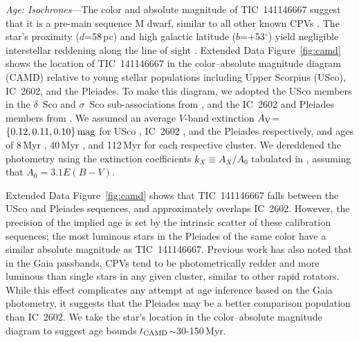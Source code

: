 \documentclass{nature3}
\begin{document}
\begin{methods}
{\it Age: Isochrones}---The color and absolute magnitude of
TIC~141146667 suggest that it is a pre-main sequence M dwarf, similar to
all other known CPVs \cite{Stauffer2017,Stauffer2021,Bouma2024}.  The
star's proximity ($d$=58\,pc) and high galactic latitude
($b$=$+$53$^\circ$) yield negligible interstellar reddening along the
line of sight \cite{Green2019}.  Extended Data Figure~\ref{fig:camd} shows the
location of TIC~141146667 in the color--absolute magnitude diagram
(CAMD) relative to young stellar populations including Upper Scorpius
(USco), IC~2602, and the Pleiades.  To make this diagram, we adopted
the USco members in the $\delta$~Sco and $\sigma$~Sco sub-associations
from \cite{Ratzenbock2023}, and the IC~2602 and Pleiades members from
\cite{Hunt2024}.  We assumed an average $V$-band extinction $A_{\rm
V}$=$\{0.12, 0.11, 0.10\}\,{\rm mag}$ for USco \cite{Pecaut2016},
IC~2602 \cite{Hunt2024}, and the Pleiades \cite{Hunt2024}
respectively, and ages of 8\,Myr \cite{Ratzenbock2023}, 40\,Myr
\cite{Randich2018}, and 112\,Myr \cite{Dahm2015} for each respective
cluster.  We dereddened the photometry using the extinction
coefficients $k_X\equiv A_X/A_0$ tabulated in
\cite{GaiaCollaboration2018}, assuming that $A_0 = 3.1 E(B-V)$.

Extended Data Figure~\ref{fig:camd} shows that TIC~141146667 falls between the USco
and Pleiades sequences, and approximately overlaps IC~2602.  However,
the precision of the implied age is set by the intrinsic scatter of
these calibration sequences; the most luminous stars in the Pleiades of
the same color have a similar absolute magnitude as TIC~141146667.
Previous work \cite{Stauffer2021} has also noted that in the Gaia
passbands, CPVs tend to be photometrically redder and more luminous than
single stars in any given cluster, similar to other rapid rotators.
While this effect complicates any attempt at age inference based on the
Gaia photometry, it suggests that the Pleiades may be a better
comparison population than IC~2602.  We take the star's
location in the color--absolute magnitude diagram to suggest age bounds
$t_{\rm CAMD}$$\sim$30-150\,Myr.



\end{methods}
\end{document}
